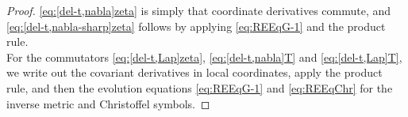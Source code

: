 \documentclass[11pt,leqno,textwidth=10cm]{amsart}
\numberwithin{equation}{section}
\theoremstyle{definition}
\theoremstyle{plain}
\newcommand{\1}{\mathbbm{1}}
\newcommand{\del}{\partial}
\newcommand{\Lap}{\Delta}
\renewcommand{\div}{\text{\normalfont{div}}}
\newcommand{\change}[1]{\color{black}#1\color{black}}
\newcommand{\delete}[1]{}
\begin{document}
\begin{proof}
\eqref{eq:[del-t,nabla]zeta} is simply that coordinate derivatives commute, and \eqref{eq:[del-t,nabla-sharp]zeta} follows by applying \eqref{eq:REEqG-1} and the product rule.\\
For the \change{commutators \eqref{eq:[del-t,Lap]zeta}, }\eqref{eq:[del-t,nabla]T} and \eqref{eq:[del-t,Lap]T}, we write out the covariant derivatives in local coordinates, apply the product rule, and then the evolution equations \eqref{eq:REEqG-1} and \eqref{eq:REEqChr} for the inverse metric and Christoffel symbols. \delete{For \eqref{eq:[del-t,Lap]zeta} [...]}%
\end{proof}
\end{document}

